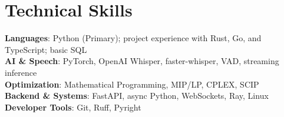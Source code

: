 \documentclass[letterpaper,11pt]{article}
\begin{document}
\section{Technical Skills}
 \begin{itemize}[leftmargin=0.15in, label={}]
    \small{\item{
     \textbf{Languages}{: Python (Primary); project experience with Rust, Go, and TypeScript; basic SQL} \\
     \textbf{AI \& Speech}{: PyTorch, OpenAI Whisper, faster-whisper, VAD, streaming inference} \\
     \textbf{Optimization}{: Mathematical Programming, MIP/LP, CPLEX, SCIP} \\
     \textbf{Backend \& Systems}{: FastAPI, async Python, WebSockets, Ray, Linux} \\
     \textbf{Developer Tools}{: Git, Ruff, Pyright}
    }}
 \end{itemize}




\end{document}
